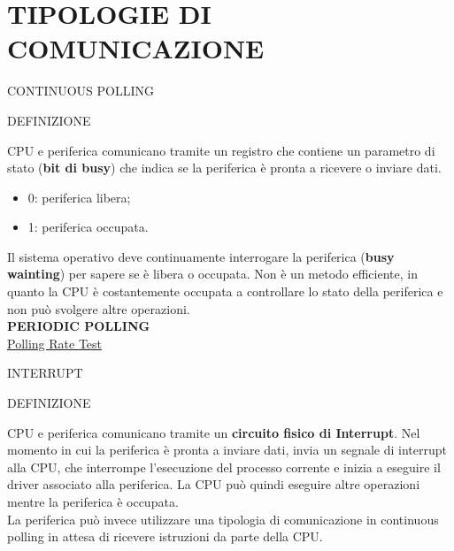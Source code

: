 \documentclass[aspectratio=1610]{beamer}
\begin{document}
\section{TIPOLOGIE DI COMUNICAZIONE}

\begin{frame}{CONTINUOUS POLLING}
    \begin{alertblock}{DEFINIZIONE}
        \begin{minipage}{0.98\linewidth}
            \justifying
            CPU e periferica comunicano tramite un registro che contiene un parametro di stato (\textbf{bit di busy}) 
            che indica se la periferica è pronta a ricevere o inviare dati.
            \begin{itemize}
                \item 0: periferica libera;
                \item 1: periferica occupata.
            \end{itemize}
            Il sistema operativo deve continuamente interrogare la periferica (\textbf{busy wainting}) per sapere se è 
            libera o occupata. Non è un metodo efficiente, in quanto la CPU è costantemente occupata a 
            controllare lo stato della periferica e non può svolgere altre operazioni.\\
            \bigskip
            \tiny{\textbf{PERIODIC POLLING}}\\
            \tiny{\href{https://pollingratetest.org/}{Polling Rate Test}}
        \end{minipage}
    \end{alertblock}
\end{frame}

\begin{frame}{INTERRUPT}
    \begin{alertblock}{DEFINIZIONE}
        \begin{minipage}{0.98\linewidth}
            \justifying
            CPU e periferica comunicano tramite un \textbf{circuito fisico di Interrupt}. 
            Nel momento in cui la periferica è pronta a inviare dati, invia un segnale di interrupt alla CPU, 
            che interrompe l'esecuzione del processo corrente e inizia a eseguire il driver associato alla periferica. 
            La CPU può quindi eseguire altre operazioni mentre la periferica è occupata.\\ 
            La periferica può invece utilizzare una tipologia di comunicazione in continuous polling in attesa di 
            ricevere istruzioni da parte della CPU.
        \end{minipage}
    \end{alertblock}
\end{frame}
\end{document}
